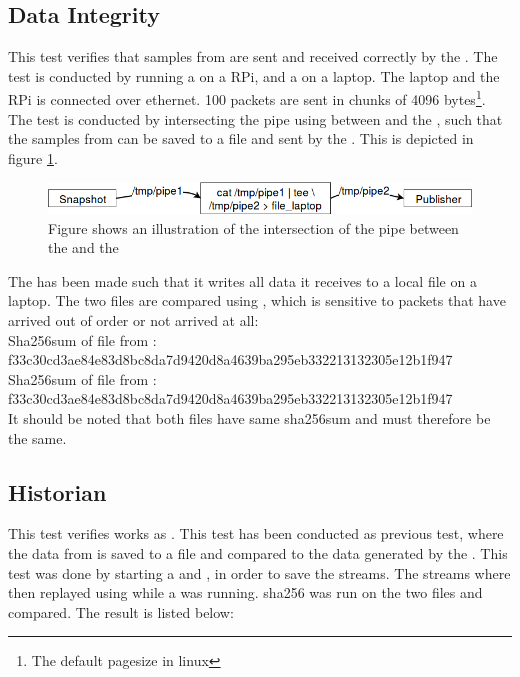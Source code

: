 \subsection{Data Integrity} \label{sec:verify:dataintegrity}
This test verifies that samples from  are sent and received correctly by the \con{}.
The test is conducted by running a \pub{} on a \ac{RPi}, and a \sub{} on a laptop. The laptop and the \ac{RPi} is connected over ethernet. 100 packets are sent in chunks of 4096 bytes\footnote{The default pagesize in linux}. The test is conducted by intersecting the pipe using  between  and the , such that the samples from  can be saved to a file and sent by the \pub{}. This is depicted in figure \ref{fig:verify:dataintegrity:sketch}.

\begin{figure}[H]
	\centering
	\includegraphics[width=\textwidth]{figures/dataintegrityverify.png}
	\caption{Figure shows an illustration of the intersection of the pipe between the  and the \pub{}} \label{fig:verify:dataintegrity:sketch}
\end{figure}

\noindent The \con{} has been made such that it writes all data it receives to a local file on a laptop. 
The two files are compared using , which is sensitive to packets that have arrived out of order or not arrived at all: \\
\noindent{}Sha256sum of file from \pub{}:\\
f33c30cd3ae84e83d8bc8da7d9420d8a4639ba295eb332213132305e12b1f947 \\
\noindent{}Sha256sum of file from \sub{}:\\
f33c30cd3ae84e83d8bc8da7d9420d8a4639ba295eb332213132305e12b1f947  \\

\noindent It should be noted that both files have same sha256sum and must therefore be the same.

\subsection{Historian}
This test verifies  works as \hist{}. This test has been conducted as previous test, where the data from  is saved to a file and compared to the data generated by the \con{}. This test was done by starting a \pub{} and , in order to save the streams. The streams where then replayed using  while a \sub{} was running. sha256 was run on the two files and compared. The result is listed below:

